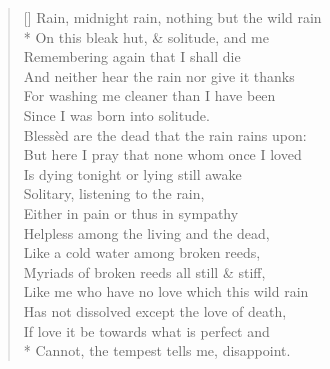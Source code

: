 \documentclass[MAIN]{subfiles}
\begin{document}
\settowidth{\versewidth}{Rain, midnight rain, nothing but the wild rain}
\begin{verse}[\versewidth]
Rain, midnight rain, nothing but the wild rain\\*
On this bleak hut, \& solitude, and me\\
Remembering again that I shall die\\
And neither hear the rain nor give it thanks\\
For washing me cleaner than I have been\\
Since I was born into solitude.\\
Bless\`ed are the dead that the rain rains upon:\\
But here I pray that none whom once I loved\\
Is dying tonight or lying still awake\\
Solitary, listening to the rain,\\
Either in pain or thus in sympathy\\
Helpless among the living and the dead,\\
Like a cold water among broken reeds,\\
Myriads of broken reeds all still \& stiff,\\
Like me who have no love which this wild rain\\
Has not dissolved except the love of death,\\
If love it be towards what is perfect and\\*
Cannot, the tempest tells me, disappoint.
\end{verse}
\end{document}
